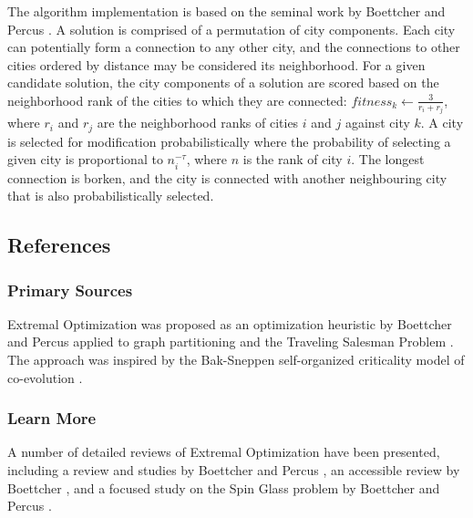 The algorithm implementation is based on the seminal work by Boettcher and Percus \cite{Boettcher1999}. A solution is comprised of a permutation of city components. Each city can potentially form a connection to any other city, and the connections to other cities ordered by distance may be considered its neighborhood. For a given candidate solution, the city components of a solution are scored based on the neighborhood rank of the cities to which they are connected: $fitness_k \leftarrow \frac{3}{r_i + r_j}$, where $r_i$ and $r_j$ are the neighborhood ranks of cities $i$ and $j$ against city $k$. A city is selected for modification probabilistically where the probability of selecting a given city is proportional to $n_i^{-\tau}$, where $n$ is the rank of city $i$. The longest connection is borken, and the city is connected with another neighbouring city that is also probabilistically selected.



\subsection{References}

% 
% 
\subsubsection{Primary Sources}
Extremal Optimization was proposed as an optimization heuristic by Boettcher and Percus applied to graph partitioning and the Traveling Salesman Problem \cite{Boettcher1999}. The approach was inspired by the Bak-Sneppen self-organized criticality model of co-evolution \cite{Bak1987, Bak1993}.

% 
% 
\subsubsection{Learn More}
A number of detailed reviews of Extremal Optimization have been presented, including a review and studies by Boettcher and Percus \cite{Boettcher2000}, an accessible review by Boettcher \cite{Boettcher2000a}, and a focused study on the Spin Glass problem by Boettcher and Percus \cite{Boettcher2001}.


